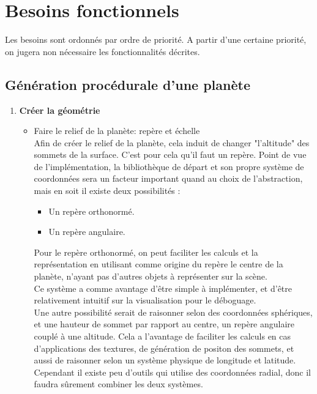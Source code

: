 \documentclass[a4paper]{article}
\begin{document}
\section{Besoins fonctionnels}

Les besoins sont ordonnés par ordre de priorité. A partir d'une certaine priorité, on jugera non nécessaire les fonctionnalités décrites.

\subsection{Génération procédurale d'une planète}
\begin{enumerate}

    \item\textbf{Créer la géométrie}
        \begin{itemize}
            \item {Faire le relief de la planète: repère et échelle}\\
            Afin de créer le relief de la planète, cela induit de changer "l'altitude" des sommets de la surface.
            C'est pour cela qu'il faut un repère.  Point de vue de l'implémentation, la bibliothèque de départ et son propre système de coordonnées sera un facteur important quand au choix de l'abstraction, mais en soit il existe deux possibilités :
            \begin{itemize}
                \item Un repère orthonormé.
                \item Un repère angulaire.
            \end{itemize}
            
            Pour le repère orthonormé, on peut faciliter les calculs et la représentation en utilisant comme origine du repère le centre de la planète, n'ayant pas d'autres objets à représenter sur la scène.\\
            Ce système a comme avantage d'être simple à implémenter, et d'être relativement intuitif sur la visualisation pour le déboguage.
            \\
            Une autre possibilité serait de raisonner selon des coordonnées sphériques, et une hauteur de sommet par rapport au centre, un repère angulaire couplé à une altitude. Cela a l'avantage de faciliter les calculs en cas d'applications des textures, de génération de positon des sommets, et aussi de raisonner selon un système physique de longitude et latitude. 
            Cependant il existe peu d'outils qui utilise des coordonnées radial, donc il faudra sûrement combiner les deux systèmes.\\
            

\end{itemize}
\end{enumerate}
\end{document}
